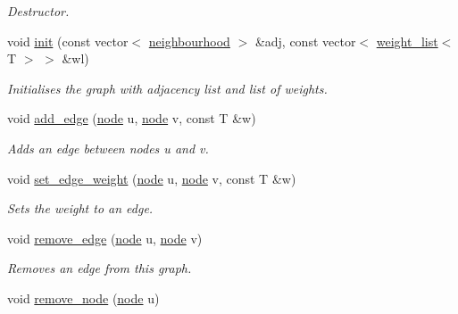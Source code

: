 \begin{DoxyCompactItemize}
\begin{DoxyCompactList}\small\item\em Destructor. \end{DoxyCompactList}\item 
void \hyperlink{classlgraph_1_1utils_1_1wdgraph_a4c1f5ba34814a8730932783759b57595}{init} (const vector$<$ \hyperlink{namespacelgraph_1_1utils_a0f2ef47028a466d26841709e705390ac}{neighbourhood} $>$ \&adj, const vector$<$ \hyperlink{namespacelgraph_1_1utils_a11e7963f3637ea13778b8d3e69d2c17f}{weight\-\_\-list}$<$ T $>$ $>$ \&wl)
\begin{DoxyCompactList}\small\item\em Initialises the graph with adjacency list and list of weights. \end{DoxyCompactList}\item 
void \hyperlink{classlgraph_1_1utils_1_1wdgraph_a5c96c31a8b5d70829bf023382d7c1997}{add\-\_\-edge} (\hyperlink{namespacelgraph_1_1utils_a7bd66ede3805ef121bc2835bd48de0cf}{node} u, \hyperlink{namespacelgraph_1_1utils_a7bd66ede3805ef121bc2835bd48de0cf}{node} v, const T \&w)
\begin{DoxyCompactList}\small\item\em Adds an edge between nodes {\itshape u} and {\itshape v}. \end{DoxyCompactList}\item 
void \hyperlink{classlgraph_1_1utils_1_1wdgraph_a38041fbb3c9cede30503a72e91077de5}{set\-\_\-edge\-\_\-weight} (\hyperlink{namespacelgraph_1_1utils_a7bd66ede3805ef121bc2835bd48de0cf}{node} u, \hyperlink{namespacelgraph_1_1utils_a7bd66ede3805ef121bc2835bd48de0cf}{node} v, const T \&w)
\begin{DoxyCompactList}\small\item\em Sets the weight to an edge. \end{DoxyCompactList}\item 
void \hyperlink{classlgraph_1_1utils_1_1wdgraph_a6b2ec7e7c66f0ae5aa8ebe5d0555c3a7}{remove\-\_\-edge} (\hyperlink{namespacelgraph_1_1utils_a7bd66ede3805ef121bc2835bd48de0cf}{node} u, \hyperlink{namespacelgraph_1_1utils_a7bd66ede3805ef121bc2835bd48de0cf}{node} v)
\begin{DoxyCompactList}\small\item\em Removes an edge from this graph. \end{DoxyCompactList}\item 
void \hyperlink{classlgraph_1_1utils_1_1wdgraph_a63740b25bf07d9943150c2c50d8be133}{remove\-\_\-node} (\hyperlink{namespacelgraph_1_1utils_a7bd66ede3805ef121bc2835bd48de0cf}{node} u)

\end{DoxyCompactItemize}
